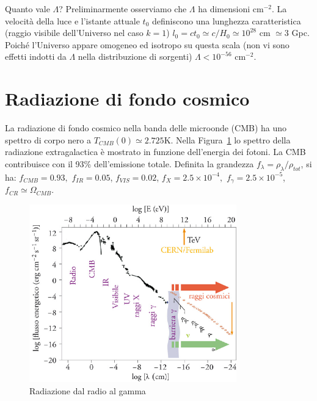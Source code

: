 Quanto vale $\Lambda$?  Preliminarmente osserviamo che $\Lambda$ ha dimensioni
cm$^{-2}$.  La velocità della luce e l'istante attuale $t_0$ definiscono una
lunghezza caratteristica (raggio visibile dell'Universo nel caso $k=1$) $l_0 = c
t_0 \simeq c/H_0 \simeq 10^{28}$ cm $\simeq$3 Gpc.  Poiché l'Universo appare
omogeneo ed isotropo su questa scala (non vi sono effetti indotti da $\Lambda$
nella distribuzione di sorgenti) $\Lambda < 10^{-56}$ cm$^{-2}$.

\section{Radiazione di fondo cosmico}

La radiazione di fondo cosmico nella banda delle microonde (CMB) ha uno spettro
di corpo nero a $T_{CMB}(0) \simeq 2.725$K.  Nella Figura~\ref{fig:radio-gamma}
lo spettro della radiazione extragalactica è mostrato in funzione dell'energia
dei fotoni.  La CMB contribuisce con il 93\% dell'emissione totale.  Definita la
grandezza $f_{\lambda}= \rho_{\lambda}/\rho_{tot}$, si ha:
$f_{CMB}=0.93,$ $f_{IR}= 0.05$, $f_{VIS}=0.02$, $f_{X}=2.5
\times 10^{-4},$ $f_{\gamma}= 2.5 \times 10^{-5}$, $f_{CR} \simeq
\Omega_{CMB}$.
\begin{figure}
  \centering{}
  \includegraphics[width=0.8\textwidth]{figure/Radiazione_radio_gamma.pdf}
  \caption{Radiazione dal radio al gamma}
  \label{fig:radio-gamma}
\end{figure}
